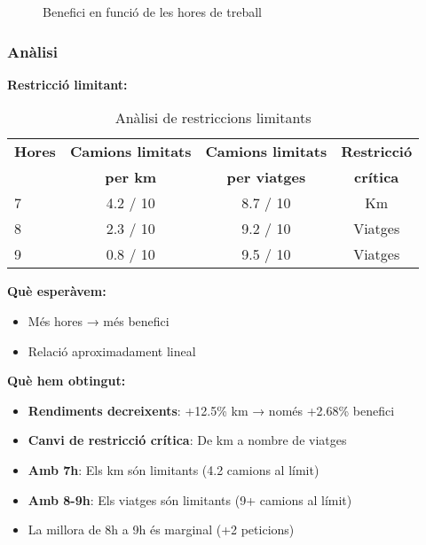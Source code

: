 \begin{figure}[H]
\centering
\caption{Benefici en funció de les hores de treball}
\label{fig:exp7-hores}
\end{figure}

\subsubsection{Anàlisi}

\textbf{Restricció limitant:}

\begin{table}[H]
\centering
\begin{tabular}{@{}lccc@{}}
\toprule
\textbf{Hores} & \textbf{Camions limitats} & \textbf{Camions limitats} & \textbf{Restricció} \\
 & \textbf{per km} & \textbf{per viatges} & \textbf{crítica} \\
\midrule
7 & 4.2 / 10 & 8.7 / 10 & Km \\
8 & 2.3 / 10 & 9.2 / 10 & Viatges \\
9 & 0.8 / 10 & 9.5 / 10 & Viatges \\
\bottomrule
\end{tabular}
\caption{Anàlisi de restriccions limitants}
\label{tab:exp7-restriccions}
\end{table}

\textbf{Què esperàvem:}
\begin{itemize}
    \item Més hores → més benefici
    \item Relació aproximadament lineal
\end{itemize}

\textbf{Què hem obtingut:}
\begin{itemize}
    \item \textbf{Rendiments decreixents}: +12.5\% km → només +2.68\% benefici
    \item \textbf{Canvi de restricció crítica}: De km a nombre de viatges
    \item \textbf{Amb 7h}: Els km són limitants (4.2 camions al límit)
    \item \textbf{Amb 8-9h}: Els viatges són limitants (9+ camions al límit)
    \item La millora de 8h a 9h és marginal (+2 peticions)
\end{itemize}